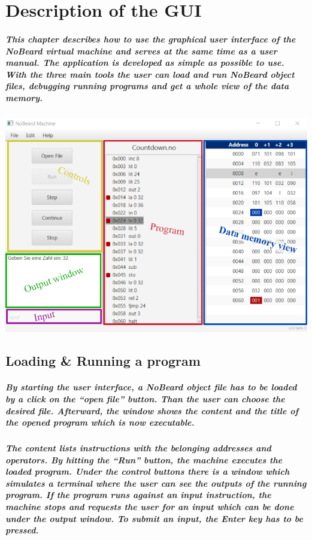 \chapter{Description of the GUI}
\paragraph{This chapter describes how to use the graphical user interface of the NoBeard virtual machine and serves at the same time as a user manual. The application is developed as simple as possible to use. With the three main tools the user can load and run NoBeard object files, debugging running programs and get a whole view of the data memory.}
\begin{center}
	\includegraphics[scale=.90]{images/screenshot-0.png}
\end{center}
\section{Loading \& Running a program}
\paragraph{By starting the user interface, a NoBeard object file has to be loaded by a click on the “open file” button. Than the user can choose the desired file. Afterward, the window shows the content and the title of the opened program which is now executable.}

\paragraph{The content lists instructions with the belonging addresses and operators. By hitting the “Run” button, the machine executes the loaded program. Under the control buttons there is a window which simulates a terminal where the user can see the outputs of the running program. If the program runs against an input instruction, the machine stops and requests the user for an input which can be done under the output window. To submit an input, the Enter key has to be pressed.}

